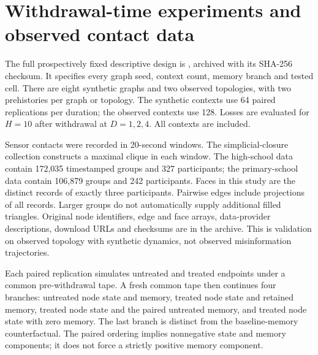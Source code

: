 \documentclass[preprint,11pt,sort&compress]{elsarticle}
\begin{document}
\section{Withdrawal-time experiments and observed contact data}\label{sec:physics_new}
The full prospectively fixed descriptive design is , archived with its SHA-256 checksum. It specifies every graph seed, context count, memory branch and tested cell. There are eight synthetic graphs and two observed topologies, with two prehistories per graph or topology. The synthetic contexts use 64 paired replications per duration; the observed contexts use 128. Losses are evaluated for $H=10$ after withdrawal at $D=1,2,4$. All contexts are included.

Sensor contacts were recorded in 20-second windows. The simplicial-closure collection constructs a maximal clique in each window. The high-school data contain 172,035 timestamped groups and 327 participants; the primary-school data contain 106,879 groups and 242 participants. Faces in this study are the distinct records of exactly three participants. Pairwise edges include projections of all records. Larger groups do not automatically supply additional filled triangles. Original node identifiers, edge and face arrays, data-provider descriptions, download URLs and checksums are in the archive. This is validation on observed topology with synthetic dynamics, not observed misinformation trajectories.

Each paired replication simulates untreated and treated endpoints under a common pre-withdrawal tape. A fresh common tape then continues four branches: untreated node state and memory, treated node state and retained memory, treated node state and the paired untreated memory, and treated node state with zero memory. The last branch is distinct from the baseline-memory counterfactual. The paired ordering implies nonnegative state and memory components; it does not force a strictly positive memory component.
\end{document}
